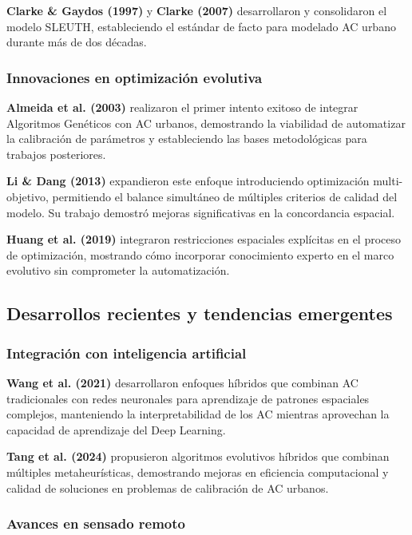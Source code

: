 \textbf{Clarke \& Gaydos (1997)} y \textbf{Clarke (2007)} desarrollaron y consolidaron el modelo SLEUTH, estableciendo el estándar de facto para modelado AC urbano durante más de dos décadas.

\subsubsection{Innovaciones en optimización evolutiva}

\textbf{Almeida et al. (2003)} realizaron el primer intento exitoso de integrar Algoritmos Genéticos con AC urbanos, demostrando la viabilidad de automatizar la calibración de parámetros y estableciendo las bases metodológicas para trabajos posteriores.

\textbf{Li \& Dang (2013)} expandieron este enfoque introduciendo optimización multi-objetivo, permitiendo el balance simultáneo de múltiples criterios de calidad del modelo. Su trabajo demostró mejoras significativas en la concordancia espacial.

\textbf{Huang et al. (2019)} integraron restricciones espaciales explícitas en el proceso de optimización, mostrando cómo incorporar conocimiento experto en el marco evolutivo sin comprometer la automatización.

\subsection{Desarrollos recientes y tendencias emergentes}

\subsubsection{Integración con inteligencia artificial}

\textbf{Wang et al. (2021)} desarrollaron enfoques híbridos que combinan AC tradicionales con redes neuronales para aprendizaje de patrones espaciales complejos, manteniendo la interpretabilidad de los AC mientras aprovechan la capacidad de aprendizaje del Deep Learning.

\textbf{Tang et al. (2024)} propusieron algoritmos evolutivos híbridos que combinan múltiples metaheurísticas, demostrando mejoras en eficiencia computacional y calidad de soluciones en problemas de calibración de AC urbanos.

\subsubsection{Avances en sensado remoto}

